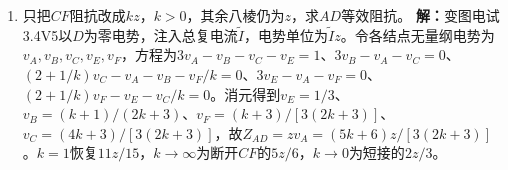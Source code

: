 \documentclass[UTF8,fontset=fandol,a4paper,11pt]{ctexart}
\begin{document}
\begin{enumerate}
\item 只把$CF$阻抗改成$kz$，$k>0$，其余八棱仍为$z$，求$AD$等效阻抗。
\textbf{解：}变图电试3.4V5以$D$为零电势，注入总复电流$\widetilde I$，电势单位为$\widetilde Iz$。令各结点无量纲电势为$v_A,v_B,v_C,v_E,v_F$，方程为$3v_A-v_B-v_C-v_E=1$、$3v_B-v_A-v_C=0$、$(2+1/k)v_C-v_A-v_B-v_F/k=0$、$3v_E-v_A-v_F=0$、$(2+1/k)v_F-v_E-v_C/k=0$。消元得到$v_E=1/3$、$v_B=(k+1)/(2k+3)$、$v_F=(k+3)/[3(2k+3)]$、$v_C=(4k+3)/[3(2k+3)]$，故$Z_{AD}=zv_A=(5k+6)z/[3(2k+3)]$。$k=1$恢复$11z/15$，$k\to\infty$为断开$CF$的$5z/6$，$k\to0$为短接的$2z/3$。
\begin{center}\begin{minipage}{.98\linewidth}\centering
{}
\end{minipage}
\end{center}
\end{enumerate}
\end{document}
